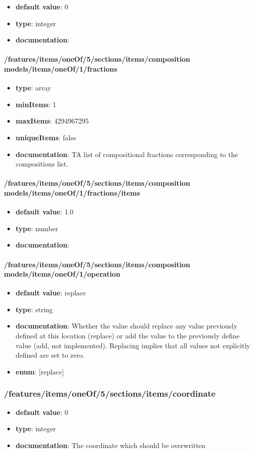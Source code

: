 \begin{itemize}\item {\bf default value}: 0
\item {\bf type}: integer
\item {\bf documentation}: 
\end{itemize}\paragraph{/features/items/oneOf/5/sections/items/composition models/items/oneOf/1/fractions}
\begin{itemize}\item {\bf type}: array
\item {\bf minItems}: 1
\item {\bf maxItems}: 4294967295
\item {\bf uniqueItems}: false
\item {\bf documentation}: TA list of compositional fractions corresponding to the compositions list.
\end{itemize}\paragraph{/features/items/oneOf/5/sections/items/composition models/items/oneOf/1/fractions/items}
\begin{itemize}\item {\bf default value}: 1.0
\item {\bf type}: number
\item {\bf documentation}: 
\end{itemize}\paragraph{/features/items/oneOf/5/sections/items/composition models/items/oneOf/1/operation}
\begin{itemize}\item {\bf default value}: replace
\item {\bf type}: string
\item {\bf documentation}: Whether the value should replace any value previously defined at this location (replace) or add the value to the previously define value (add, not implemented). Replacing implies that all values not explicitly defined are set to zero.
\item {\bf enum}: [replace]\end{itemize}\subsubsection{/features/items/oneOf/5/sections/items/coordinate}
\begin{itemize}\item {\bf default value}: 0
\item {\bf type}: integer
\item {\bf documentation}: The coordinate which should be overwritten
\end{itemize}